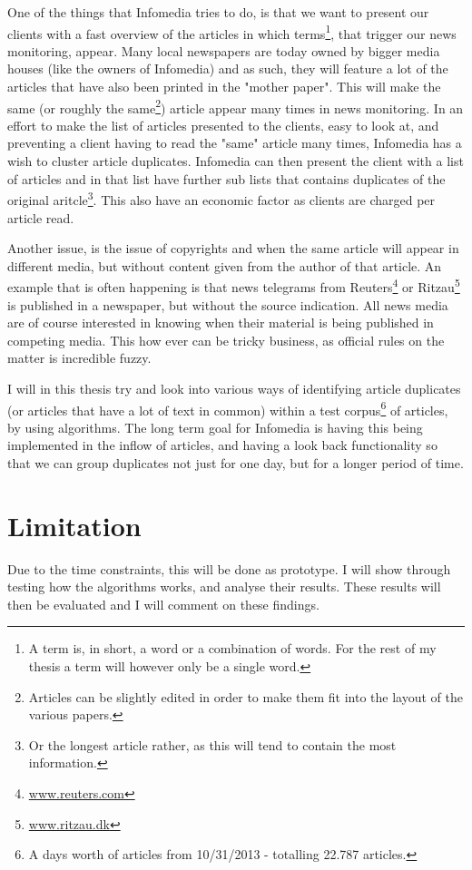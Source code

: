 One of the things that Infomedia tries to do, is that we want to present our clients with a fast overview of the articles in which terms\footnote{A term is, in short, a word or a combination of words. For the rest of my thesis a term will however only be a single word.}, that trigger our news monitoring, appear. Many local newspapers are today owned by bigger media houses (like the owners of Infomedia) and as such, they will feature a lot of the articles that have also been printed in the "mother paper". This will make the same (or roughly the same\footnote{Articles can be slightly edited in order to make them fit into the layout of the various papers.}) article appear many times in news monitoring. In an effort to make the list of articles presented to the clients, easy to look at, and preventing a client having to read the "same" article many times, Infomedia has a wish to cluster article duplicates. Infomedia can then present the client with a list of articles and in that list have further sub lists that contains duplicates of the original aritcle\footnote{Or the longest article rather, as this will tend to contain the most information.}. This also have an economic factor as clients are charged per article read.

Another issue, is the issue of copyrights and when the same article will appear in different media, but without content given from the author of that article. An example that is often happening is that news telegrams from Reuters\footnote{\url{www.reuters.com}} or Ritzau\footnote{\url{www.ritzau.dk}} is published in a newspaper, but without the source indication. All news media are of course interested in knowing when their material is being published in competing media. This how ever can be tricky business, as official rules on the matter is incredible fuzzy.

I will in this thesis try and look into various ways of identifying article duplicates (or articles that have a lot of text in common) within a test corpus\footnote{A days worth of articles from 10/31/2013 - totalling 22.787 articles.} of articles, by using algorithms. The long term goal for Infomedia is having this being implemented in the inflow of articles, and having a look back functionality so that we can group duplicates not just for one day, but for a longer period of time.

\section{Limitation}
Due to the time constraints, this will be done as prototype. I will show through testing how the algorithms works, and analyse their results. These results will then be evaluated and I will comment on these findings.
